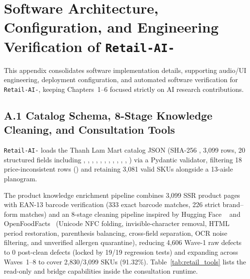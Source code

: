 \appendix

\chapter{Software Architecture, Configuration, and Engineering Verification of \texttt{Retail-AI-}}
\label{app:retail_ai}

This appendix consolidates software implementation details, supporting audio/UI engineering, deployment configuration, and automated software verification for \texttt{Retail-AI-}, keeping Chapters~1--6 focused strictly on AI research contributions.

\section*{A.1 Catalog Schema, 8-Stage Knowledge Cleaning, and Consultation Tools}
\texttt{Retail-AI-} loads the Thanh Lam Mart catalog JSON (SHA-256 , 3,099 rows, 20 structured fields including , , , , , , , , , , , ) via a Pydantic validator, filtering 18 price-inconsistent rows () and retaining 3,081 valid SKUs alongside a 13-aisle planogram.

The product knowledge enrichment pipeline combines 3,099 SSR product pages with EAN-13 barcode verification (333 exact barcode matches, 226 strict brand--form matches) and an 8-stage cleaning pipeline inspired by Hugging Face ~\cite{hf_datatrove} and OpenFoodFacts~\cite{openfoodfacts} (Unicode NFC folding, invisible-character removal, HTML  period restoration, parenthesis balancing, cross-field separation, OCR noise filtering, and unverified allergen quarantine), reducing 4,606 Wave-1 raw defects to 0 post-clean defects (locked by 19/19 regression tests) and expanding across Waves~1--8 to cover 2,830/3,099 SKUs (91.32\%). Table~\ref{tab:retail_tools} lists the read-only and bridge capabilities inside the consultation runtime.

